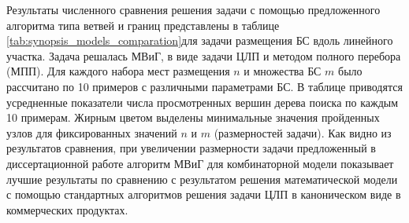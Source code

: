   Результаты численного сравнения решения задачи с помощью предложенного алгоритма типа ветвей и границ представлены в таблице \cref{tab:synopsis_models_comparation}для задачи размещения БС вдоль линейного участка. Задача решалась МВиГ, в виде задачи ЦЛП и методом полного перебора (МПП). Для каждого набора мест размещения $n$ и множества БС $m$  было рассчитано по 10 примеров с различными параметрами БС. В таблице приводятся усредненные показатели числа просмотренных вершин дерева поиска по каждым 10 примерам. Жирным цветом выделены минимальные значения пройденных узлов для фиксированных значений $n$ и $m$ (размерностей задачи). Как видно из результатов сравнения, при увеличении размерности задачи предложенный в диссертационной работе алгоритм МВиГ для комбинаторной модели показывает лучшие результаты по сравнению с результатом решения математической модели с помощью стандартных алгоритмов решения задачи ЦЛП в каноническом виде в коммерческих продуктах.


